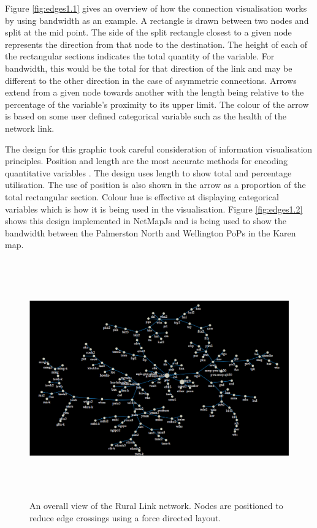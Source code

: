 \documentclass[11pt, a4paper]{article}
\begin{document}
Figure \ref{fig:edges1.1} gives an overview of how the connection visualisation
works by using bandwidth as an example. A rectangle is drawn between two nodes
and split at the mid point. The side of the split rectangle closest to a given
node represents the direction from that node to the destination. The height of
each of the rectangular sections indicates the total quantity of the variable.
For bandwidth, this would be the total for that direction of the link and may be
different to the other direction in the case of asymmetric connections. Arrows
extend from a given node towards another with the length being relative to the
percentage of the variable's proximity to its upper limit.  The colour of the
arrow is based on some user defined categorical variable such as the health of
the network link.

The design for this graphic took careful consideration of information
visualisation principles. Position and length are the most accurate methods for
encoding quantitative variables \cite{Spence_2007}. The design uses length to
show total and percentage utilisation. The use of position is also shown in the
arrow as a proportion of the total rectangular section. Colour hue is effective
at displaying categorical variables which is how it is being used in the
visualisation. Figure \ref{fig:edges1.2} shows this design implemented in
NetMapJs and is being used to show the bandwidth between the Palmerston North
and Wellington PoPs in the Karen map.

\begin{figure}
\centering
\includegraphics[width=170mm,height=102.54mm]{assets/edges1-0.eps}
\caption{An overall view of the Rural Link network. Nodes are positioned to
reduce edge crossings using a force directed layout.}
\label{fig:edges1.0}
\end{figure}
\end{document}
